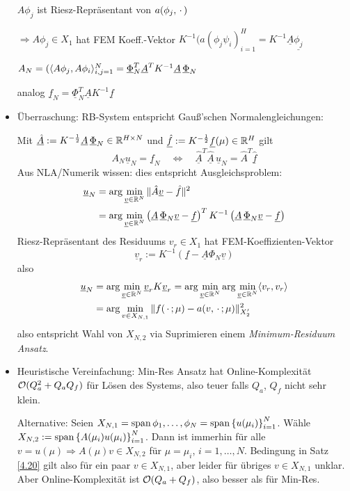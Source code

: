 \begin{bem}
\begin{itemize}
		$A\phi_j$ ist Riesz-Repräsentant von $a(\phi_j,\pdot)$
		
		$\Rightarrow A\phi_j \in X_1$ hat FEM Koeff.-Vektor $K^{-1} (a(\phi_j \psi_i)_{i=1}^H = K^{-1} \underline{A} \underline{\phi_j}$
		
		$A_N= (\dotp{A\phi_j}{A\phi_i}_{i,j=1}^N = \underline{\Phi}_N^T \underline{A}^T K^{-1} \underline{A} \, \underline{\Phi}_N$
		
		analog $\underline{f}_N = \underline{\Phi}_N^T \underline{A} K^{-1} \underline{f}$
		\item Überraschung: RB-System entspricht Gauß'schen Normalengleichungen:

			Mit $\underline{\hat A} := K^{-\frac{1}{2}} \underline{A} \, \underline{\Phi}_N \in \mathbb{R}^{H \times N}$ und $\underline{\hat f} := K^{-\frac{1}{2}} \underline{f}(\mu) \in \mathbb{R}^H$ gilt
			\[
				A_N \underline{u}_N = \underline{f}_N \quad \Leftrightarrow \quad \underline{\hat A}^T \underline{\hat A} \, \underline{u}_N = \hat A^T \underline{\hat f}
			\]
			Aus NLA/Numerik wissen: dies entspricht Ausgleichsproblem:
			\begin{align*}
				\underline{u}_N &= \arg \min_{\underline{v} \in \mathbb{R}^N} \|\hat A \underline{v} - \hat f\|^2 \\
				&= \arg \min_{\underline{v} \in \mathbb{R}^N} \left( \underline{A} \, \underline{\Phi}_N \underline{v} - \underline{f} \right)^T K^{-1} \left( \underline{A} \, \underline{\Phi}_N \underline{v} - \underline{f} \right)
			\end{align*}
			Riesz-Repräsentant des Residuums $v_r \in X_1$ hat FEM-Koeffizienten-Vektor
			\[
				\underline{v}_r := K^{-1} \left( \underline{f} - \underline{A} \Phi_N \underline{v} \right)
			\]
			also
			\begin{align*}
				\underline{u}_N &= \arg\min_{\underline{v} \in \mathbb{R}^N} \underline{v}_r K \underline{v}_r = \arg\min_{\underline{v} \in \mathbb{R}^N} \arg\min_{\underline{v} \in \mathbb{R}^N} \langle v_r, v_r \rangle\\
				&= \arg\min_{v \in X_{N,1}} \|f(\,\cdot\,;\mu)-a(v,\,\cdot\,;\mu)\|_{X_2'}^2
			\end{align*}
			also entspricht Wahl von $X_{N,2}$ via Suprimieren einem \emph{Minimum-Residuum Ansatz}.
		\item Heuristische Vereinfachung: Min-Res Ansatz hat Online-Komplexität $\mathcal O(Q_a^2 + Q_a Q_f)$ für Lösen des Systems, also teuer falls $Q_a$, $Q_f$ nicht sehr klein.

			Alternative: Seien $X_{N,1} = \spn{\phi_1,\ldots,\phi_N} = \spn{\set{u(\mu_i)}_{i=1}^N}$. Wähle $X_{N,2} := \operatorname{span}\left\{A(\mu_i) u(\mu_i)\right\}_{i=1}^N$. Dann ist immerhin für alle $v = u(\mu) \Rightarrow A(\mu) v \in X_{N,2}$ für $\mu = \mu_i$, $i = 1,\ldots,N$. Bedingung in Satz \ref{4.20} gilt also für ein paar $v \in X_{N,1}$, aber leider für übriges $v \in X_{N,1}$ unklar. Aber Online-Komplexität ist $\mathcal O(Q_a+Q_f)$, also besser als für Min-Res.
		\end{itemize}
\end{bem}

